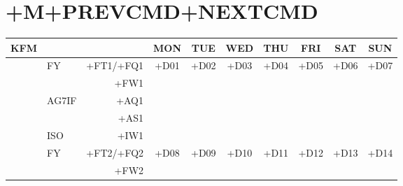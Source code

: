 \chapter*{\textbf{+M}\hfill{\footnotesize+PREVCMD+NEXTCMD}}
\begin{center}
{\ttfamily%
\begin{tabular}{|c|lr|c|c|c|c|c|c|c|}
\hline
    KFM                 &       &           & MON                        & TUE                        & WED                        & THU                        & FRI                        & SAT                        & SUN                        \\ 
\hline
    \multirow{5}{0.5in}{} & FY    & +FT1/+FQ1 & \multirow[t]{5}{1in}{+D01} & \multirow[t]{5}{1in}{+D02} & \multirow[t]{5}{1in}{+D03} & \multirow[t]{5}{1in}{+D04} & \multirow[t]{5}{1in}{+D05} & \multirow[t]{5}{1in}{+D06} & \multirow[t]{5}{1in}{+D07} \\
                        &       &      +FW1 &                            &                            &                            &                            &                            &                            &                            \\
                        & AG7IF &      +AQ1 &                            &                            &                            &                            &                            &                            &                            \\
                        &       &      +AS1 &                            &                            &                            &                            &                            &                            &                            \\
                        & ISO   &      +IW1 &                            &                            &                            &                            &                            &                            &                            \\
\hline
    \multirow{5}{0.5in}{} & FY    & +FT2/+FQ2 & \multirow[t]{5}{1in}{+D08} & \multirow[t]{5}{1in}{+D09} & \multirow[t]{5}{1in}{+D10} & \multirow[t]{5}{1in}{+D11} & \multirow[t]{5}{1in}{+D12} & \multirow[t]{5}{1in}{+D13} & \multirow[t]{5}{1in}{+D14} \\
                        &       &      +FW2 &                            &                            &                            &                            &                            &                            &                            \\

\end{tabular}}
\end{center}
